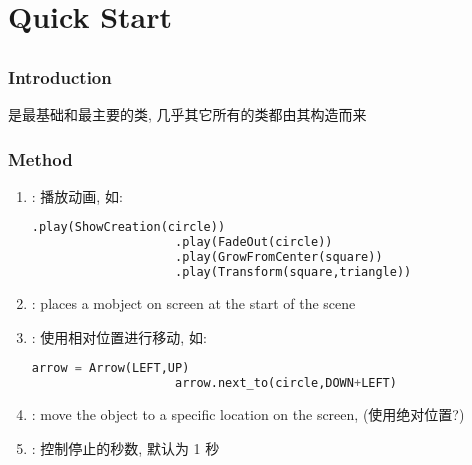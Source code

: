 \chapter{Quick Start}
\section{}
    \subsection{Introduction}
        \hspace*{2em} 是最基础和最主要的类, 几乎其它所有的类都由其构造而来

    \subsection{Method}
        \begin{enumerate}
            \item {}: 播放动画, 如:
                \begin{lstlisting}[language=Python, gobble=20]
                    .play(ShowCreation(circle))
                    .play(FadeOut(circle))
                    .play(GrowFromCenter(square))
                    .play(Transform(square,triangle))
                \end{lstlisting}
            \item {}: places a mobject on screen at the start of the scene
            \item {}: 使用相对位置进行移动, 如:
                \begin{lstlisting}[language = {Python}, gobble = 20]
                    arrow = Arrow(LEFT,UP)
                    arrow.next_to(circle,DOWN+LEFT)
                \end{lstlisting}
            \item {}: move the object to a specific location on the screen, (使用绝对位置?)
            \item {}: 控制停止的秒数, 默认为 1 秒
        \end{enumerate}
        
\section{}
